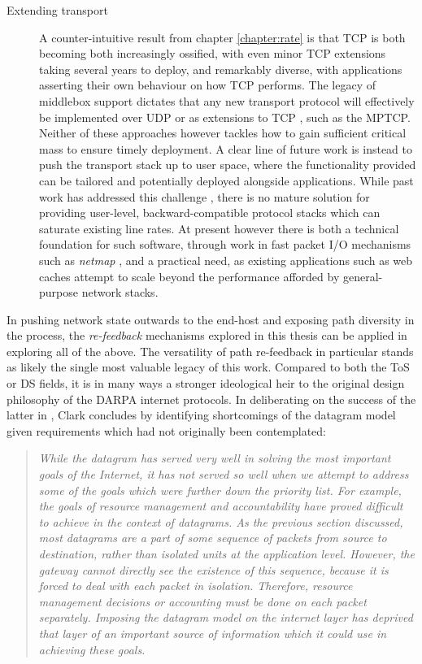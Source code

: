 \begin{description}
\item[Extending transport]{
A counter-intuitive result from chapter \ref{chapter:rate} is that \ac{TCP} is both becoming both increasingly ossified, with even minor \ac{TCP} extensions taking several years to deploy, and remarkably diverse, with applications asserting their own behaviour on how \ac{TCP} performs.
The legacy of middlebox support dictates that any new transport protocol will effectively be implemented over \acs{UDP} or as extensions to \ac{TCP} \cite{Honda11}, such as the \ac{MPTCP}.
Neither of these approaches however tackles how to gain sufficient critical mass to ensure timely deployment.
A clear line of future work is instead to push the transport stack up to user space, where the functionality provided can be tailored and potentially deployed alongside applications.
While past work has addressed this challenge \cite{Thekkath93,sctpuser}, there is no mature solution for providing user-level, backward-compatible protocol stacks which can saturate existing line rates. 
At present however there is both a technical foundation for such software, through work in fast packet \acs{I/O} mechanisms such as \emph{netmap} \cite{Rizzo12acmq}, and a practical need, as existing applications such as web caches attempt to scale beyond the performance afforded by general-purpose network stacks.
}
\end{description}

In pushing network state outwards to the end-host and exposing path diversity in the process, the \emph{re-feedback} mechanisms explored in this thesis can be applied in exploring all of the above.
The versatility of path re-feedback in particular stands as likely the single most valuable legacy of this work.
Compared to both the \ac{ToS} or \ac{DS} fields, it is in many ways a stronger ideological heir to the original design philosophy of the \acs{DARPA} internet protocols.
In deliberating on the success of the latter in \cite{Clark:1988p478}, Clark concludes by identifying shortcomings of the datagram model given requirements which had not originally been contemplated:

\begin{quote}
\textit{While the datagram has served very well in solving the most important goals of the Internet, it has not served so well when we attempt to address some of the goals which were further down the priority list. 
For example, the goals of resource management and accountability have proved difficult to achieve in the context of datagrams.
As the previous section discussed, most datagrams are a part of some sequence of packets from source to destination, rather than isolated units at the application level.  
However, the gateway cannot directly see the existence of this sequence, because it is forced to deal with each packet in isolation.  
Therefore, resource management decisions or accounting must be done on each packet separately.  
Imposing the datagram model on the internet layer has deprived that layer of an important source of information which it could use in achieving these goals.}
\end{quote}

